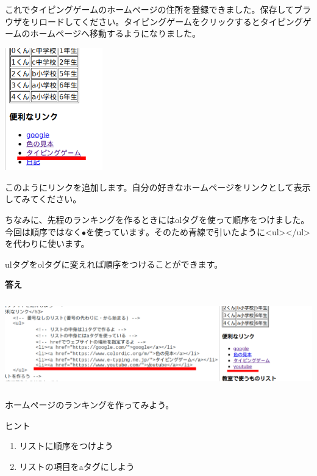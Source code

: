 \documentclass[a4paper,12pt]{jarticle}
\begin{document}
\bigskip
\flushleft

これでタイピングゲームのホームページの住所を登録できました。保存してブラウザをリロードしてください。タイピングゲームをクリックするとタイピングゲームのホームページへ移動するようになりました。


\bigskip
\centering
\includegraphics[width=4.235cm,height=5.276cm]{textbook-img201.png}


\flushleft
このようにリンクを追加します。自分の好きなホームページをリンクとして表示してみてください。

ちなみに、先程のランキングを作るときにはolタグを使って順序をつけました。今回は順序ではなく${\bullet}を使っています。そのため青線で引いたように${\textless}ul{\textgreater}{\textless}/ul{\textgreater}を代わりに使います。

ulタグをolタグに変えれば順序をつけることができます。


\bigskip

\textbf{答え}

\centering
\includegraphics[width=14.617cm,height=3.821cm]{textbook-img202.png}

\flushleft
{}\theQuestion\label{Q:hasAnswer04-10}


ホームページのランキングを作ってみよう。

ヒント

\begin{enumerate}
  \item リストに順序をつけよう
  \item リストの項目をaタグにしよう
\end{enumerate}
\end{document}

